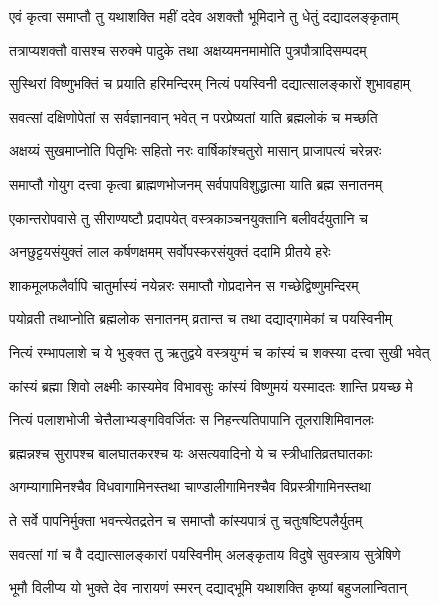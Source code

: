 \twolineshloka
{एवं कृत्वा समाप्तौ तु यथाशक्ति महीं ददेव}
{अशक्तौ भूमिदाने तु धेतुं दद्यादलङ्कृताम्} %

\twolineshloka
{तत्राप्यशक्तौ वासश्च सरुक्मे पादुके तथा}
{अक्षय्यमनमामोति पुत्रपौत्रादिसम्पदम्} %

\twolineshloka
{सुस्थिरां विष्णुभक्तिं च प्रयाति हरिमन्दिरम्}
{नित्यं पयस्विनी दद्यात्सालङ्कारों शुभावहाम्} %

\twolineshloka
{सवत्सां दक्षिणोपेतां स सर्वज्ञानवान् भवेत्}
{न परप्रेष्यतां याति ब्रह्मलोकं च मच्छति} %

\twolineshloka
{अक्षय्यं सुखमाप्नोति पितृभिः सहितो नरः}
{वार्षिकांश्चतुरो मासान् प्राजापत्यं चरेन्नरः} %

\twolineshloka
{समाप्तौ गोयुग दत्त्वा कृत्वा ब्राह्मणभोजनम्}
{सर्वपापविशुद्धात्मा याति ब्रह्म सनातनम्} %

\twolineshloka
{एकान्तरोपवासे तु सीराण्यष्टौ प्रदापयेत्}
{वस्त्रकाञ्चनयुक्तानि बलीवर्दयुतानि च} %

\twolineshloka
{अनछुट्टयसंयुक्तं लाल कर्षणक्षमम्}
{सर्वोपस्करसंयुक्तं ददामि प्रीतये हरेः} %

\twolineshloka
{शाकमूलफलैर्वापि चातुर्मास्यं नयेन्नरः}
{समाप्तौ गोप्रदानेन स गच्छेद्विष्णुमन्दिरम्} %

\twolineshloka
{पयोव्रती तथाप्नोति ब्रह्मलोक सनातनम्}
{व्रतान्त च तथा दद्याद्गामेकां च पयस्विनीम्} %

\twolineshloka
{नित्यं रम्भापलाशे च ये भुङ्क्त तु ऋतुद्वये}
{वस्त्रयुग्मं च कांस्यं च शक्स्या दत्त्वा सुखी भवेत्} %

\twolineshloka
{कांस्यं ब्रह्मा शिवो लक्ष्मीः कास्यमेव विभावसुः}
{कांस्यं विष्णुमयं यस्मादतः शान्ति प्रयच्छ मे} %

\twolineshloka
{नित्यं पलाशभोजी चेत्तैलाभ्यङ्गविवर्जितः}
{स निहन्त्यतिपापानि तूलराशिमिवानलः} %

\twolineshloka
{ब्रह्मन्नश्च सुरापश्च बालघातकरश्च यः}
{असत्यवादिनो ये च स्त्रीधातिव्रतघातकाः} %

\twolineshloka
{अगम्यागामिनश्चैव विधवागामिनस्तथा}
{चाण्डालीगामिनश्चैव विप्रस्त्रीगामिनस्तथा} %

\twolineshloka
{ते सर्वे पापनिर्मुक्ता भवन्त्येतद्रतेन च}
{समाप्तौ कांस्यपात्रं तु चतुःषष्टिपलैर्युतम्} %

\twolineshloka
{सवत्सां गां च वै दद्यात्सालङ्कारां पयस्विनीम्}
{अलङ्कृताय विदुषे सुवस्त्राय सुत्रेषिणे} %

\twolineshloka
{भूमौ विलीप्य यो भुक्ते देव नारायणं स्मरन्}
{दद्याद्भूमि यथाशक्ति कृष्यां बहुजलान्वितान्} %


